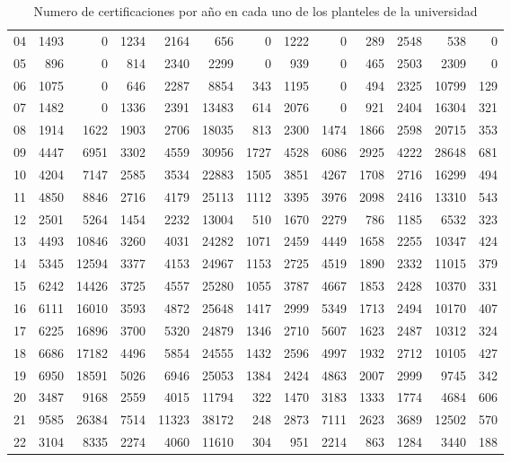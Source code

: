 \documentclass[12pt]{article}
\begin{document}
\begin{table}[ht]
{\begin{tabular}{||c||rrrrrr||rrrrrr||}
  04 & 1493 & 0 & 1234 & 2164 & 656 & 0& 1222 &    0  & 289 & 2548 &  538  &    0\\
  05 & 896 & 0 & 814 & 2340 & 2299 & 0&  939 &    0  & 465 & 2503 & 2309  &    0\\
  06 & 1075 & 0 & 646 & 2287 & 8854 & 343& 1195 &    0  & 494 & 2325 &10799  &  129\\
  07 & 1482 & 0 & 1336 & 2391 & 13483 & 614& 2076 &    0  & 921 & 2404 &16304  &  321\\
  08 & 1914 & 1622 & 1903 & 2706 & 18035 & 813& 2300 & 1474 & 1866 & 2598 &20715  &  353\\
  09 & 4447 & 6951&3302&  4559 &30956 &  1727& 4528 & 6086 & 2925 & 4222 &28648   &681\\
  10 & 4204 & 7147 & 2585 & 3534& 22883 &  1505& 3851 & 4267 & 1708 & 2716 &16299  &  494\\
  11 & 4850 & 8846 & 2716 & 4179& 25113 &  1112& 3395 & 3976 & 2098 & 2416 &13310  &  543\\
  12 & 2501 & 5264 & 1454 & 2232& 13004  &  510& 1670 & 2279 &  786 & 1185 & 6532  &  323\\
  13 & 4493 &10846 & 3260 & 4031& 24282  & 1071& 2459 & 4449 & 1658 & 2255 &10347  &  424\\
  14 & 5345 &12594 & 3377 & 4153& 24967  & 1153& 2725 & 4519 & 1890 & 2332 &11015  &  379\\
  15 & 6242 &14426 & 3725 & 4557& 25280  & 1055& 3787 & 4667 & 1853 & 2428 &10370  &  331\\
  16 & 6111 &16010 & 3593 & 4872& 25648  & 1417& 2999 & 5349 & 1713 & 2494 &10170  &  407\\
  17 & 6225 &16896 & 3700 & 5320& 24879  & 1346& 2710 & 5607 & 1623 & 2487 &10312  &  324\\
  18 & 6686 &17182 & 4496 & 5854& 24555  & 1432& 2596 & 4997 & 1932 & 2712 &10105  &  427\\
  19 & 6950 &18591 & 5026 & 6946& 25053  & 1384& 2424 & 4863 & 2007 & 2999 & 9745  &  342\\
  20 & 3487 & 9168 & 2559 & 4015& 11794  &  322& 1470 & 3183 & 1333 & 1774 & 4684  &  606\\
  21 & 9585 &26384 & 7514 &11323& 38172  &  248& 2873 & 7111 & 2623 & 3689 &12502  &  570\\
  22 & 3104 & 8335 & 2274 & 4060& 11610  &  304&  951 & 2214 &  863 & 1284 & 3440  &  188\\\hline\hline
\end{tabular}}
\caption{Numero de certificaciones por a\~no en cada uno de los planteles de la universidad}
\label{Tabla_Certificaciones_Plantel_Anho}
\end{table}
\end{document}

